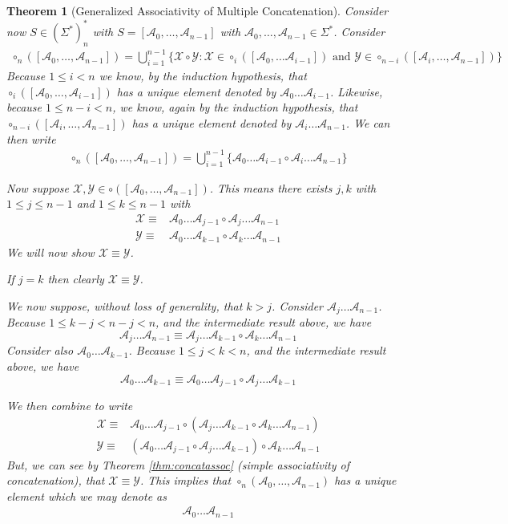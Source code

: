 \documentclass[12pt]{article}
\theoremstyle{break}
\theoremstyle{break}
\newtheorem{theorem}{Theorem}[section]
\theoremstyle{break}
\theoremstyle{break}
\theoremstyle{break}
\newtheorem{informal definition}[definition]{Informal Definition}
\newcommand{\mc}[1]{\mathcal{#1}}
\begin{document}
\begin{theorem}[Generalized Associativity of Multiple Concatenation]
Consider now $S\in (\Sigma^*)^*_n$ with $S = [\mc{A}_0,\ldots,\mc{A}_{n-1}]$ with $\mc{A}_0,\ldots,\mc{A}_{n-1}\in \Sigma^*$.
Consider
\begin{align*}
\circ_n([\mc{A}_0,\ldots, \mc{A}_{n-1}]) = \bigcup_{i=1}^{n-1} \{\mc{X}\circ\mc{Y}:\mc{X} \in \circ_i([\mc{A}_0,\ldots \mc{A}_{i-1}]) \text{ and } \mc{Y}\in \circ_{n-i}([\mc{A}_{i}, \ldots, \mc{A}_{n-1}])\}
\end{align*}
Because $1\le i<n$ we know, by the induction hypothesis, that $\circ_i([\mc{A}_0, \ldots, \mc{A}_{i-1}])$ has a unique element denoted by $\mc{A}_0\ldots\mc{A}_{i-1}$.
Likewise, because $1 \le n-i < n$, we know, again by the induction hypothesis, that $\circ_{n-i}([\mc{A}_i, \ldots, \mc{A}_{n-1}])$ has a unique element denoted by $\mc{A}_i \ldots \mc{A}_{n-1}$.
We can then write
\begin{align}
\circ_n([\mc{A}_0, \ldots, \mc{A}_{n-1}]) = \bigcup_{i=1}^{n-1} \{\mc{A}_0\ldots\mc{A}_{i-1}\circ\mc{A}_i\ldots\mc{A}_{n-1}\}
\end{align}

Now suppose $\mc{X}, \mc{Y} \in \circ([\mc{A}_0, \ldots, \mc{A}_{n-1}])$.
This means there exists $j, k$ with $1 \le j \le n-1$ and $1 \le k \le n-1$ with
\begin{align}
\mc{X} \equiv& \mc{A}_0\ldots\mc{A}_{j-1} \circ \mc{A}_j \ldots \mc{A}_{n-1}\\
\mc{Y} \equiv& \mc{A}_0\ldots\mc{A}_{k-1} \circ \mc{A}_k \ldots \mc{A}_{n-1}
\end{align}
We will now show $\mc{X} \equiv \mc{Y}$.

If $j=k$ then clearly $\mc{X}\equiv \mc{Y}$.

We now suppose, without loss of generality, that $k>j$.
Consider $\mc{A}_j\ldots\mc{A}_{n-1}$.
Because $1 \le k-j < n-j < n$, and the intermediate result above, we have
$$
\mc{A}_j\ldots\mc{A}_{n-1} \equiv \mc{A}_j\ldots\mc{A}_{k-1}\circ \mc{A}_k\ldots\mc{A}_{n-1}
$$
Consider also $\mc{A}_0\ldots \mc{A}_{k-1}$.
Because $1 \le j < k < n$, and the intermediate result above, we have
$$
\mc{A}_0\ldots\mc{A}_{k-1} \equiv \mc{A}_0\ldots\mc{A}_{j-1}\circ\mc{A}_j\ldots\mc{A}_{k-1}
$$

We then combine to write
\begin{align}
\mc{X} \equiv& \mc{A}_0\ldots\mc{A}_{j-1} \circ (\mc{A}_j\ldots\mc{A}_{k-1} \circ \mc{A}_k\ldots\mc{A}_{n-1})\\
\mc{Y} \equiv& (\mc{A}_0\ldots\mc{A}_{j-1}\circ\mc{A}_j\ldots\mc{A}_{k-1})\circ\mc{A}_k\ldots\mc{A}_{n-1}
\end{align}
But, we can see by Theorem \ref{thm:concatassoc} (simple associativity of concatenation), that $\mc{X}\equiv \mc{Y}$.
This implies that $\circ_n(\mc{A}_0,\ldots, \mc{A}_{n-1})$ has a unique element which we may denote as
\begin{align*}
\mc{A}_0\ldots\mc{A}_{n-1}
\end{align*}

\end{theorem}
\end{document}
